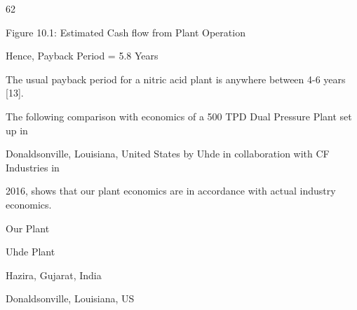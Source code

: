 \documentclass[a4paper,portrait,12pt]{article}
\begin{document}
62





\begin{flushleft}
Figure 10.1: Estimated Cash flow from Plant Operation
\end{flushleft}





\begin{flushleft}
Hence, Payback Period = 5.8 Years
\end{flushleft}





\begin{flushleft}
The usual payback period for a nitric acid plant is anywhere between 4-6 years [13].
\end{flushleft}


\begin{flushleft}
The following comparison with economics of a 500 TPD Dual Pressure Plant set up in
\end{flushleft}


\begin{flushleft}
Donaldsonville, Louisiana, United States by Uhde in collaboration with CF Industries in
\end{flushleft}


\begin{flushleft}
2016, shows that our plant economics are in accordance with actual industry economics.
\end{flushleft}


\begin{flushleft}
Our Plant
\end{flushleft}





\begin{flushleft}
Uhde Plant
\end{flushleft}





\begin{flushleft}
Hazira, Gujarat, India
\end{flushleft}





\begin{flushleft}
Donaldsonville, Louisiana, US
\end{flushleft}
\end{document}
